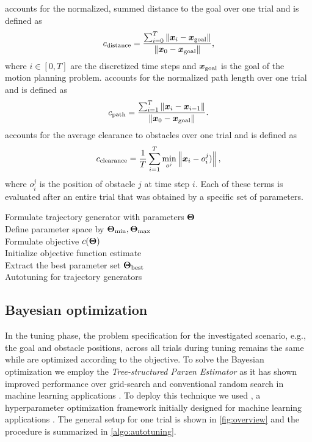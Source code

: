 \costdist{} accounts for the normalized, summed distance to the goal over one trial and is defined as
\begin{equation}
    c_{\textrm{distance}} = \frac{\sum_{i=0}^{T} \left\lVert\bm{x}_i - \bm{\bm{x}_\textrm{goal}}\right\rVert}{\left\lVert\bm{x}_0 - \bm{\bm{x}_\textrm{goal}}\right\rVert},
\end{equation}
where $i\in[0, T]$ are the discretized time steps and $\bm{\bm{x}_\textrm{goal}}$ is the goal of the motion planning problem.
\costpath{} accounts for the normalized path length over one trial and is defined as
\begin{equation}
    c_{\textrm{path}} = \frac{\sum_{i=1}^{T} \left\lVert\bm{x}_i - \bm{x}_{i-1}\right\rVert}{\left\lVert\bm{x}_0 - \bm{\bm{x}_\textrm{goal}}\right\rVert}.
\end{equation}
\costcol{} accounts for the average clearance to obstacles over one trial and is defined as
\begin{equation}
    c_{\textrm{clearance}} = \frac{1}{T}\sum_{i=1}^{T} \min_{o^j}\left\lVert\bm{x}_i - o^j_i)\right\rVert, 
\end{equation}
where $o^j_i$ is the position of obstacle $j$ at time step $i$.
Each of these terms is evaluated after an entire trial that was obtained by a specific set of parameters.
%
\begin{algorithm}
\SetAlgoLined
Formulate trajectory generator with parameters $\bm{\Theta}$\\
Define parameter space by $\bm{\Theta}_{\textrm{min}},\bm{\Theta}_{\textrm{max}}$\\
Formulate objective $c(\bm{\Theta})$\\
Initialize objective function estimate \costestimate{} \\
Extract the best parameter set $\bm{\Theta}_{\textrm{best}}$\\
\caption{Autotuning for trajectory generators}
\label{algo:autotuning}
\end{algorithm}
%
\subsection{Bayesian optimization}
\label{sub:bayesian_optimization}
%
In the tuning phase, the problem specification for the investigated scenario,
e.g., the goal and obstacle positions, across all trials during tuning remains
the same while \params{} are optimized according to the objective. To solve the
Bayesian optimization we employ the \textit{Tree-structured Parzen Estimator} as
it has shown improved performance over grid-search and conventional random
search in machine learning applications
\cite{turner2021bayesian,bergstra_algorithms_nodate}. To deploy this technique
we used \optuna{}, a hyperparameter optimization framework initially designed
for machine learning applications \cite{optuna}. The general setup for one trial
is shown in \cref{fig:overview} and the procedure is summarized in
\cref{algo:autotuning}. 
%
